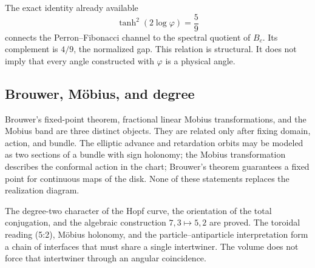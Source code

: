 The exact identity already available
\[
\tanh^2(2\log\varphi)=\frac59
\]
connects the Perron--Fibonacci channel to the spectral quotient of \(B_c\). Its
complement is \(4/9\), the normalized gap. This relation is structural.
It does not imply that every angle constructed with \(\varphi\) is a physical angle.

\subsection{Brouwer, Möbius, and degree}

Brouwer's fixed-point theorem, fractional linear Mobius transformations,
and the Mobius band are three distinct objects. They are related only
after fixing domain, action, and bundle. The elliptic advance and
retardation orbits may be modeled as two sections of a bundle with sign
holonomy; the Mobius transformation describes the conformal action in the chart;
Brouwer's theorem guarantees a fixed point for continuous maps of the disk.
None of these statements replaces the realization diagram.

\begin{fronteraBox}[title={Result and boundary}]
The degree-two character of the Hopf curve, the orientation of the
total conjugation, and the algebraic construction \(7,3\mapsto5,2\) are proved. The
toroidal reading (5{:}2), Möbius holonomy, and the
particle--antiparticle interpretation form a chain of interfaces that must share a
single intertwiner. The volume does not force that intertwiner through an
angular coincidence.
\end{fronteraBox}
